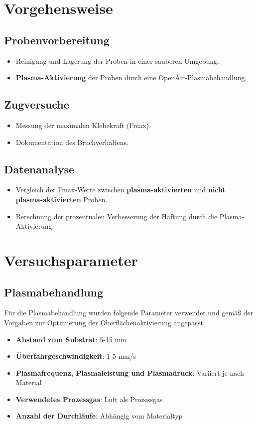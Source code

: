 \documentclass[a4paper,12pt]{article}
\begin{document}
\section{Vorgehensweise}

\subsection*{Probenvorbereitung}
\begin{itemize}
    \item Reinigung und Lagerung der Proben in einer sauberen Umgebung.
    \item \textbf{Plasma-Aktivierung} der Proben durch eine OpenAir-Plasmabehandlung.
\end{itemize}

\subsection*{Zugversuche}
\begin{itemize}
    \item Messung der maximalen Klebekraft (Fmax).
    \item Dokumentation des Bruchverhaltens.
\end{itemize}

\subsection*{Datenanalyse}
\begin{itemize}
    \item Vergleich der Fmax-Werte zwischen \textbf{plasma-aktivierten} und \textbf{nicht plasma-aktivierten} Proben.
    \item Berechnung der prozentualen Verbesserung der Haftung durch die Plasma-Aktivierung.
\end{itemize}

\section{Versuchsparameter}

\subsection{Plasmabehandlung}
Für die Plasmabehandlung wurden folgende Parameter verwendet und gemäß der Vorgaben zur Optimierung der Oberflächenaktivierung angepasst:
\begin{itemize}
    \item \textbf{Abstand zum Substrat}: 5-15 mm
    \item \textbf{Überfahrgeschwindigkeit}: 1-5 mm/s
    \item \textbf{Plasmafrequenz, Plasmaleistung und Plasmadruck}: Variiert je nach Material
    \item \textbf{Verwendetes Prozessgas}: Luft als Prozessgas
    \item \textbf{Anzahl der Durchläufe}: Abhängig vom Materialtyp
\end{itemize}
\end{document}
